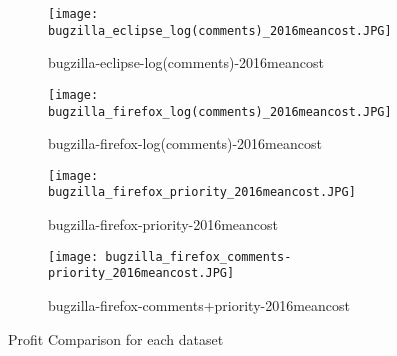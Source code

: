 \begin{figure*}[h]
\begin{subfigure}{\columnwidth}
\texttt{[image: bugzilla\_eclipse\_log(comments)\_2016meancost.JPG]}
\caption{bugzilla-eclipse-log(comments)-2016meancost}
\label{fig:subim1}
\end{subfigure}
\begin{subfigure}{\columnwidth}
\texttt{[image: bugzilla\_firefox\_log(comments)\_2016meancost.JPG]}
\caption{bugzilla-firefox-log(comments)-2016meancost}
\label{fig:subim2}
\end{subfigure}
\begin{subfigure}{\columnwidth}
\texttt{[image: bugzilla\_firefox\_priority\_2016meancost.JPG]}
\caption{bugzilla-firefox-priority-2016meancost}
\label{fig:subim3}
\end{subfigure}
\begin{subfigure}{\columnwidth}
\texttt{[image: bugzilla\_firefox\_comments-priority\_2016meancost.JPG]}
\caption{bugzilla-firefox-comments+priority-2016meancost}
\label{fig:subim4}
\end{subfigure}

\caption{Profit Comparison for each dataset}
\label{fig:image1}
\end{figure*}




